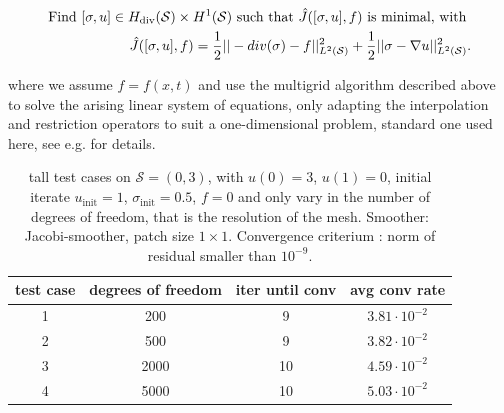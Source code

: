 \documentclass[../draft_1.tex]{subfiles}
\begin{document}
\begin{ceqn}
	\begin{equation}
	\begin{aligned}
	\text{Find } [\sigma, u] \in H_{\mathop{}\!\mathrm{div}}(\mathcal{S}) \times H^1(\mathcal{S}) \text{ such that } \hat{J}([\sigma, u], f) \text{ is minimal, with } \\
\hat{J}([\sigma, u], f) = \frac{1}{2}|| - div(\sigma) - f ||_{L^2(\mathcal{S})}^2  + \frac{1}{2} || \sigma - \nabla u ||_{L^2(\mathcal{S})}^2.
	\end{aligned}
	\end{equation}
\end{ceqn}
where we assume $f = f(x,t)$ and use the multigrid algorithm described above to solve the arising linear system of equations, only adapting the interpolation and restriction operators to suit a one-dimensional problem, standard one used here, see e.g. \cite{briggs2000multigrid} for details.

\begin{table}
	\begin{center}
		\begin{tabular}{||c | c | c | c ||} 
			\hline
			test case & degrees of freedom & iter until conv & avg conv rate \\ [0.5ex] 
			\hline\hline
			1 & 200 & 9 &  $3.81 \cdot 10^{-2}$ \\ 
			\hline		
			2 & 500 & 9 & $3.82 \cdot 10^{-2}$ \\ 
			\hline
			3 & 2000 & 10 &   $4.59 \cdot 10^{-2}$   \\
			\hline
			4 & 5000 & 10 &  $5.03 \cdot 10^{-2}$ \\
			\hline
		\end{tabular}
	\end{center}
	\caption{tall test cases on $\mathcal{S} = (0,3)$, with $u(0) = 3$, $u(1) = 0$, initial iterate $u_{\text{init}} = 1$, $\sigma_{\text{init}} = 0.5$, $f = 0$ and only vary in the number of degrees of freedom, that is the resolution of the mesh. Smoother: Jacobi-smoother, patch size $1 \times 1$. Convergence criterium : norm of residual smaller than $10^{-9}$.}
	\label{table:Table_mg_poisson}
\end{table}
\end{document}
